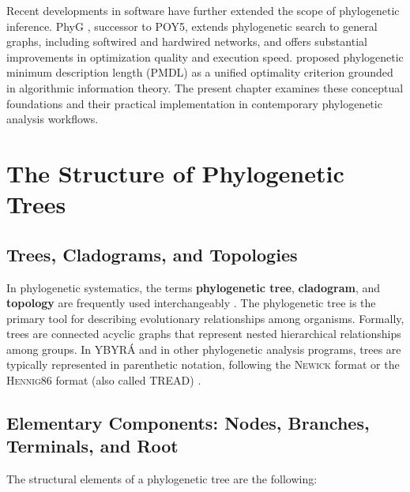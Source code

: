 Recent developments in software have further extended the scope of phylogenetic inference. PhyG \parencite{wheeleretal2024}, successor to POY5, extends phylogenetic search to general graphs, including softwired and hardwired networks, and offers substantial improvements in optimization quality and execution speed. \textcite{wheelervaron2025} proposed phylogenetic minimum description length (PMDL) as a unified optimality criterion grounded in algorithmic information theory. The present chapter examines these conceptual foundations and their practical implementation in contemporary phylogenetic analysis workflows.

\section{The Structure of Phylogenetic Trees}

\subsection{Trees, Cladograms, and Topologies}

In phylogenetic systematics, the terms \textbf{phylogenetic tree}, \textbf{cladogram}, and \textbf{topology} are frequently used interchangeably \parencite{wheeler2012}. The phylogenetic tree is the primary tool for describing evolutionary relationships among organisms. Formally, trees are connected acyclic graphs that represent nested hierarchical relationships among groups. In YBYRÁ and in other phylogenetic analysis programs, trees are typically represented in parenthetic notation, following the \textsc{Newick} format or the \textsc{Hennig86} format (also called \textsc{TREAD}) \parencite{machado2015}.

\subsection{Elementary Components: Nodes, Branches, Terminals, and Root}

The structural elements of a phylogenetic tree are the following:

